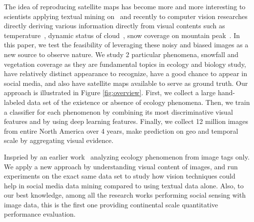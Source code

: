 The idea of reproducing satellite maps has become more and more interesting to scientists applying 
textual mining on~\cite{bollen11twitter,ecology2012www,you2015multifacetedelections,wood2013usingtourism} 
and recently to computer vision researches directly deriving various information directly from visual contents such as
 temperature~\cite{glasner2015hot}, dynamic status of cloud~\cite{murdock}, snow coverage on mountain peak~\cite{fedorov2015snowwatch, fedorov2014snow}.
In this paper, we test the feasibility of leveraging these noisy and biased images as a new 
source to observe nature. We study 2 particular phenomena, snowfall and vegetation 
coverage as they are fundamental topics in ecology and biology study, have relatively 
distinct appearance to recognize, have a good chance to appear in social media, 
and also have satellite maps available to serve as ground truth. Our approach is 
illustrated in Figure \ref{fig:overview}. 
First, we collect a large hand-labeled data set of the existence or absence of ecology phenomena. 
Then, we train a classifier for each phenomenon by combining its most discriminative visual 
features and by using deep learning features. 
Finally, we collect 12 million images from entire North America over 4 years, make prediction 
on geo and temporal scale by aggregating visual evidence.

Inspried by an earlier work~\cite{ecology2012www} 
analyzing ecology phenomenon from image tags only. We apply a new approach by 
understanding visual content of images, and run experiments on the exact same 
data set to study how vision techniques could help in social media data mining 
compared to using textual data alone. Also, to our best knowledge, among all the 
research works performing social sensing with image data, this is the first one 
providing continental scale quantitative performance evaluation.


